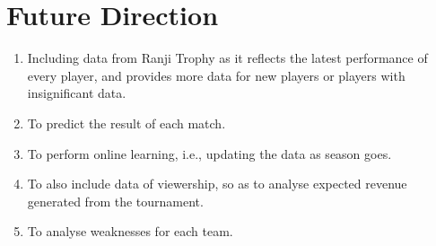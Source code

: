 \documentclass[12pt]{article}
\begin{document}
\section*{Future Direction}
\begin{enumerate}
\item Including data from Ranji Trophy as it reflects the latest performance of every player, and provides more data for new players or players with insignificant data.
\item To predict the result of each match.
\item To perform online learning, i.e., updating the data as season goes.
\item To also include data of viewership, so as to analyse expected revenue generated from the tournament.
\item To analyse weaknesses for each team.

\end{enumerate}
\end{document}
